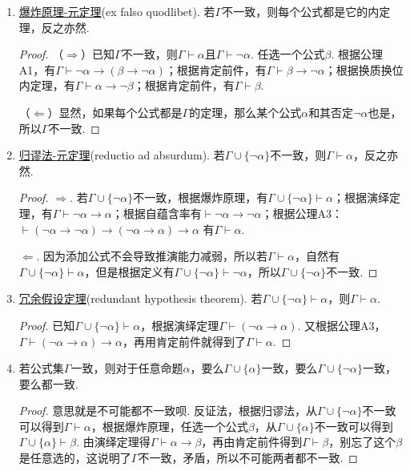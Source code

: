 \begin{enumerate}
    \item \underline{爆炸原理-元定理}(ex falso quodlibet). 若$\Gamma$不一致，则每个公式都是它的内定理，反之亦然.
    \begin{proof}
        （$\Rightarrow$）已知$\Gamma$不一致，则$\Gamma \vdash \alpha$且$\Gamma \vdash \neg \alpha$. 任选一个公式$\beta$.
        根据公理A1，有$\Gamma \vdash \neg \alpha \to (\beta \to \neg \alpha)$；根据肯定前件，有$\Gamma \vdash \beta \to \neg \alpha$；根据换质换位内定理，有$\Gamma \vdash \alpha \to \neg \beta$；根据肯定前件，有$\Gamma \vdash \beta$.
        
        （$\Leftarrow$）显然，如果每个公式都是$\Gamma$的定理，那么某个公式$\alpha$和其否定$\neg \alpha$也是，所以$\Gamma$不一致.
    \end{proof}
    
    \item \underline{归谬法-元定理}(reductio ad absurdum). 若$\Gamma \cup \{\neg \alpha\}$不一致，则$\Gamma \vdash \alpha$，反之亦然.
    \begin{proof}
        $\Rightarrow$. 若$ \Gamma \cup \{\neg \alpha\} $不一致，根据爆炸原理，有$ \Gamma \cup \{\neg \alpha\} \vdash \alpha $；根据演绎定理，有$ \Gamma \vdash \neg \alpha \to \alpha $；根据自蕴含率有$\vdash \neg \alpha \to \neg \alpha$；根据公理A3：$\vdash (\neg \alpha \to \neg \alpha) \to (\neg \alpha \to \alpha) \to \alpha $ 有$ \Gamma \vdash \alpha $.

        $\Leftarrow$. 因为添加公式不会导致推演能力减弱，所以若$\Gamma \vdash \alpha$，自然有$\Gamma \cup \{\neg \alpha\} \vdash \alpha $，但是根据定义有$ \Gamma \cup \{\neg \alpha\} \vdash \neg \alpha $，所以$\Gamma \cup \{\neg \alpha\}$不一致.
    \end{proof}

    \item \underline{冗余假设定理}(redundant hypothesis theorem). 若$ \Gamma \cup \{\neg \alpha\} \vdash \alpha $，则$ \Gamma \vdash \alpha $.
    \begin{proof}
        已知$ \Gamma \cup \{\neg \alpha\} \vdash \alpha $，根据演绎定理$ \Gamma \vdash (\neg \alpha \to \alpha) $. 又根据公理A3，$ \Gamma \vdash (\neg \alpha \to \alpha) \to \alpha $，再用肯定前件就得到了$ \Gamma \vdash \alpha $.
    \end{proof}

    \item 若公式集$\Gamma$一致，则对于任意命题$\alpha$，要么$\Gamma \cup \{\alpha\}$一致，要么$\Gamma \cup \{\neg\alpha\}$一致，要么都一致.
    \begin{proof}
        意思就是不可能都不一致呗. 反证法，根据归谬法，从$\Gamma \cup \{\neg \alpha\}$不一致可以得到$\Gamma \vdash \alpha$，根据爆炸原理，任选一个公式$\beta$，从$\Gamma \cup \{\alpha\}$不一致可以得到$\Gamma \cup \{\alpha\} \vdash \beta$. 由演绎定理得$\Gamma \vdash \alpha \to \beta$，再由肯定前件得到$\Gamma \vdash \beta$，别忘了这个$\beta$是任意选的，这说明了$\Gamma$不一致，矛盾，所以不可能两者都不一致.
    \end{proof}

\end{enumerate}

